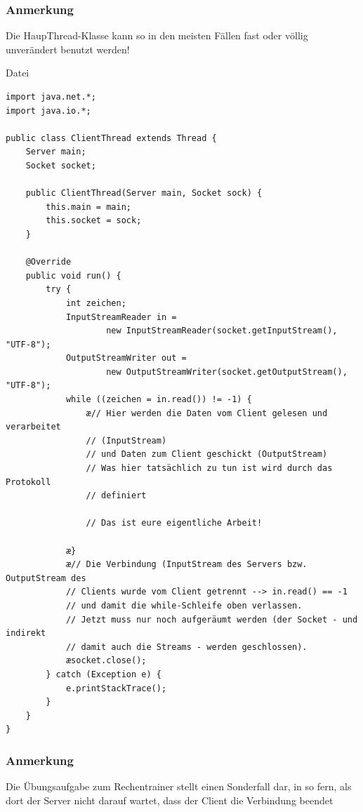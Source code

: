 \subsubsection{Anmerkung}

Die HaupThread-Klasse kann so in den meisten Fällen fast oder völlig
unverändert benutzt werden!

\pagebreak

Datei 

\begin{lstlisting}
import java.net.*;
import java.io.*;

public class ClientThread extends Thread {
    Server main;
    Socket socket;

    public ClientThread(Server main, Socket sock) {
        this.main = main;
        this.socket = sock;
    }

    @Override
    public void run() {
        try {
            int zeichen;
            InputStreamReader in = 
                    new InputStreamReader(socket.getInputStream(), "UTF-8");
            OutputStreamWriter out = 
                    new OutputStreamWriter(socket.getOutputStream(), "UTF-8");
            while ((zeichen = in.read()) != -1) {
                æ// Hier werden die Daten vom Client gelesen und verarbeitet
                // (InputStream)
                // und Daten zum Client geschickt (OutputStream)
                // Was hier tatsächlich zu tun ist wird durch das Protokoll
                // definiert

                // Das ist eure eigentliche Arbeit!

            æ}
            æ// Die Verbindung (InputStream des Servers bzw. OutputStream des
            // Clients wurde vom Client getrennt --> in.read() == -1
            // und damit die while-Schleife oben verlassen.
            // Jetzt muss nur noch aufgeräumt werden (der Socket - und indirekt
            // damit auch die Streams - werden geschlossen).
            æsocket.close();
        } catch (Exception e) {
            e.printStackTrace();
        }
    }
}
\end{lstlisting}

\subsubsection{Anmerkung}

Die Übungsaufgabe zum Rechentrainer stellt einen Sonderfall dar, in so fern,
als dort der Server nicht darauf wartet, dass der Client die Verbindung beendet

